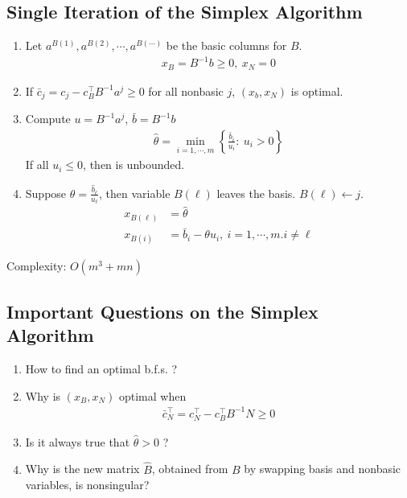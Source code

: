 \documentclass[11pt]{article}
\numberwithin{equation}{section}
\begin{document}
\subsection{Single Iteration of the Simplex Algorithm}
\begin{enumerate}\addtocounter{enumi}{-1}
    \item Let $a^{B(1)},a^{B(2)}, \cdots , a^{B(\cdots)}$ be the basic columns for $B$. \begin{align*}
        x_B = B^{-1}b \geq 0, \ x_N=0
    \end{align*}
    \item If $\bar{c}_j = c_j - c^\top_B B^{-1} a^j \geq 0$ for all nonbasic $j$, $(x_b, x_N)$ is optimal.
    \item Compute $u=B^{-1}a^j$, $\bar{b}=B^{-1}b$ \begin{align*}
        \hat{\theta} = \min_{i=1, \cdots, m} \left\{ \frac{\bar{b}_i}{u_i}: \ u_i > 0 \right\} 
    \end{align*}
    If all $u_i \leq 0$, then is unbounded.
    \item Suppose $\hat{\theta} = \frac{\hat{b}_\ell}{u_\ell}$, then variable $B(\ell)$ leaves the basis. $B(\ell) \leftarrow j$. \begin{align*}
        x_{B(\ell)} &= \hat{\theta}\\
        x_{B(i)} &= \bar{b}_i - \theta u_i, \ i=1, \cdots, m. i \neq \ell
    \end{align*}
\end{enumerate}
Complexity: $O(m^3 +mn)$

\subsection{Important Questions on the Simplex Algorithm}
\begin{enumerate}[Q1]
    \item How to find an optimal b.f.s. ?
    \item Why is $\left( x_B, x_N \right)$ optimal when \begin{align*}
        \bar{c}_{N}^{\top}=c_{N}^{\top}-c_{B}^{\top} B^{-1} N \geq 0
    \end{align*}
    \item Is it always true that $\hat{\theta} > 0$ ?
    \item Why is the new matrix $\hat{B}$, obtained from $B$ by swapping basis and nonbasic variables, is nonsingular?
\end{enumerate}
\end{document}
